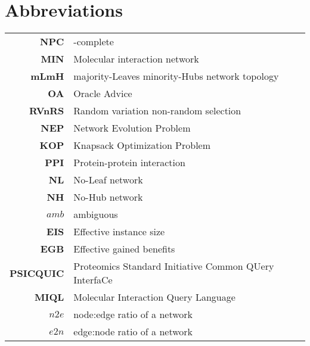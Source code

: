 \documentclass[12pt]{article}	%
\newcommand{\myC}[1]{{\relsize{-1}{$\mathcal{#1}$}}} %
\begin{document}
\section{Abbreviations}
		 \begin{table}[H]
                \setlength\arrayrulewidth{.1pt}
        		\begin{tabular}[H]{r|l}
                        \textbf{NPC}    & \myC{NP}-complete \\
                        \textbf{MIN}    & Molecular interaction network \\
                		\textbf{mLmH}   & majority-Leaves minority-Hubs network topology \\
                		\textbf{OA}     & Oracle Advice \\
                		\textbf{RVnRS}  & Random variation non-random selection \\
                		\textbf{NEP}    & Network Evolution Problem \\
                		\textbf{KOP}    & Knapsack Optimization Problem \\
                		\textbf{PPI}    & Protein-protein interaction \\
                		\textbf{NL}     & No-Leaf network \\
                		\textbf{NH}     & No-Hub network \\
                		\textbf{$amb$}  & ambiguous \\
                		\textbf{EIS}    & Effective instance size \\
                		\textbf{EGB}    & Effective gained benefits \\%

                        \textbf{PSICQUIC} & Proteomics Standard Initiative Common QUery InterfaCe \\
                        \textbf{MIQL} & Molecular Interaction Query Language \\
                        ${n2e}$ & node:edge ratio of a network \\
                        ${e2n}$ & edge:node ratio of a network \\
        		\end{tabular}
        \end{table}
\end{document}

